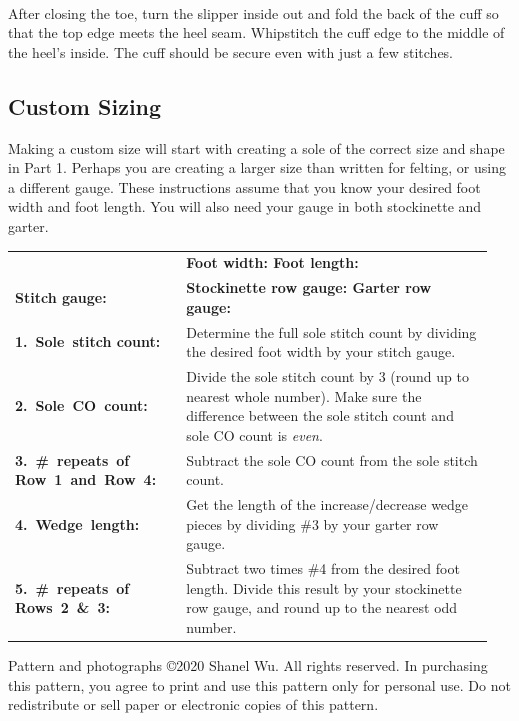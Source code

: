 \documentclass[12pt]{article}
\renewcommand{\arraystretch}{2} %
\newcommand{\blank}{\underline{\hspace{2em}} } %
\newenvironment{frnote}
    {%
    	\setlength{\FrameRule}{1.5pt}
    	\def\FrameCommand{\fboxrule=\FrameRule\fboxsep=\FrameSep \fcolorbox{framecolor}{shadecolor}}
    	\MakeFramed {\FrameRestore}}
    {\setlength{\FrameRule}{1pt}
	\endMakeFramed}
\begin{document}
~\\
After closing the toe, turn the slipper inside out and fold the back of the cuff so that the top edge meets the heel seam. Whipstitch the cuff edge to the middle of the heel's inside. The cuff should be secure even with just a few stitches.

\subsection*{Custom Sizing}

Making a custom size will start with creating a sole of the correct size and shape in Part 1. Perhaps you are creating a larger size than written for felting, or using a different gauge. These instructions assume that you know your desired foot width and foot length. You will also need your gauge in both stockinette and garter.

\begin{flushleft} \renewcommand{\arraystretch}{1.5}
\begin{tabular}{p{0.2\linewidth} p{0.75\linewidth}}
~ & \textbf{Foot width: \blank} \hspace{0.5in} \textbf{Foot length: \blank} \\ 
\textbf{Stitch gauge: \blank} & \textbf{Stockinette row gauge: \blank} \hspace{0.5in} \textbf{Garter row gauge: \blank} \vspace{1em} \\
\textbf{\mbox{1. Sole stitch} count: \blank} & Determine the full sole stitch count by dividing the desired foot width by your stitch gauge. \\
\textbf{\mbox{2. Sole CO count:} \blank} & Divide the sole stitch count by 3 (round up to nearest whole number). Make sure the difference between the sole stitch count and sole CO count is \emph{even}. \\
\textbf{\mbox{3. \# repeats of} \mbox{Row 1 and Row 4: \blank}} &  Subtract the sole CO count from the sole stitch count. \\
\textbf{\mbox{4. Wedge length:} \blank} & Get the length of the increase/decrease wedge pieces by dividing \#3 by your garter row gauge. \\
\textbf{\mbox{5. \# repeats of} \mbox{Rows 2 \& 3: \blank}} & Subtract two times \#4 from the desired foot length. Divide this result by your stockinette row gauge, and round up to the nearest odd number.
\end{tabular}\end{flushleft}


\begin{frnote} \ssmall
Pattern and photographs \copyright 2020 Shanel Wu.
All rights reserved. In purchasing this pattern, you agree to print and use this pattern only for personal use. Do not redistribute or sell paper or electronic copies of this pattern.
\end{frnote}
\end{document}
